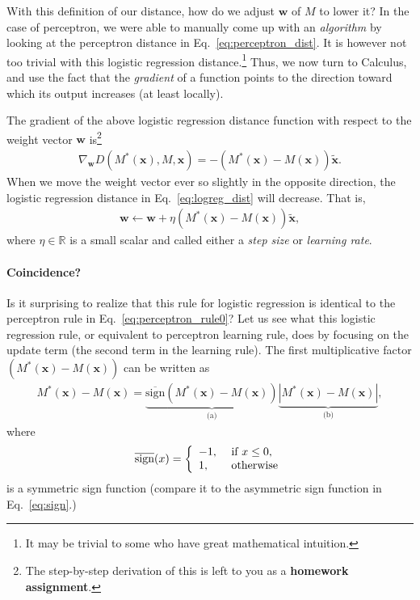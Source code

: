 \documentclass{report}
\newcommand{\vect}[1]{\mathbf{#1}}
\newcommand{\vx}[0]{\vect{x}}
\newcommand{\vw}[0]{\vect{w}}
\newcommand{\sign}{\text{sign}}
\begin{document}
With this definition of our distance, how do we adjust $\vw$ of $M$ to lower it?
In the case of perceptron, we were able to manually come up with an {\it
algorithm} by looking at the perceptron distance in
Eq.~\eqref{eq:perceptron_dist}. It is however not too trivial with this logistic
regression distance.\footnote{
    It may be trivial to some who have great mathematical intuition.
}
Thus, we now turn to Calculus, and use the fact that the {\it gradient} of a
function points to the direction toward which its output increases (at least
locally). 

The gradient of the above logistic regression distance function with respect to
the weight vector $\vw$ is\footnote{
    The step-by-step derivation of this is left to you as a {\bf homework
    assignment}. 
}
\begin{align}
    \label{eq:grad_logreg_dist}
    \nabla_{\vw} D(M^*(\vx), M, \vx) = -(M^*(\vx) - M(\vx)) \tilde{\vx}.
\end{align}
When we move the weight vector ever so slightly in the opposite direction, the
logistic regression distance in Eq.~\eqref{eq:logreg_dist} will decrease. That
is,
\begin{align}
    \label{eq:logreg_rule0}
    \vw \leftarrow \vw + \eta \left( M^*(\vx) - M(\vx)\right) \tilde{\vx},
\end{align}
where $\eta \in \mathbb{R}$ is a small scalar and called either a {\it step
size} or {\it learning rate}. 

\paragraph{Coincidence?}

Is it surprising to realize that this rule for logistic regression is identical
to the perceptron rule in Eq.~\eqref{eq:perceptron_rule0}? Let us see what this
logistic regression rule, or equivalent to perceptron learning rule, does by
focusing on the update term (the second term in the learning rule). The first
multiplicative factor $(M^*(\vx) - M(\vx))$ can be written as
\begin{align}
    \label{eq:grad_logreg_term1}
    M^*(\vx) - M(\vx) = \underbrace{\overline{\sign}(M^*(\vx) - M(\vx))}_{\text{(a)}}
    \underbrace{\left| M^*(\vx) - M(\vx) \right|}_{\text{(b)}},
\end{align}
where 
\begin{align*}
    \overline{\sign}(x) = \left\{ \begin{array}{l l}
            -1,&\text{ if } x \leq 0, \\
            1,&\text{ otherwise}
        \end{array}
        \right.
\end{align*}
is a symmetric sign function (compare it to the asymmetric sign function in
Eq.~\eqref{eq:sign}.)
\end{document}
